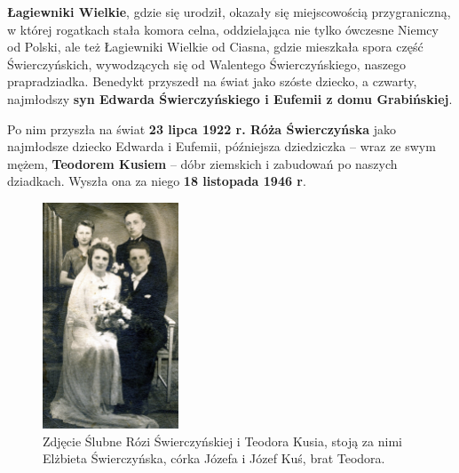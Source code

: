 \textbf{Łagiewniki Wielkie}, gdzie się urodził, okazały się miejscowością przygraniczną, w której rogatkach stała komora celna, oddzielająca nie tylko ówczesne Niemcy od Polski, ale też Łagiewniki Wielkie od Ciasna, gdzie mieszkała spora część Świerczyńskich, wywodzących się od Walentego Świerczyńskiego, naszego prapradziadka. Benedykt przyszedł na świat jako szóste dziecko, a czwarty, najmłodszy \textbf{syn Edwarda Świerczyńskiego i Eufemii z domu Grabińskiej}.

Po nim przyszła na świat \textbf{23 lipca 1922 r. Róża Świerczyńska} jako najmłodsze dziecko Edwarda i Eufemii, późniejsza dziedziczka -- wraz ze swym mężem, \textbf{Teodorem Kusiem} -- dóbr ziemskich i zabudowań po naszych dziadkach. Wyszła ona za niego \textbf{18 listopada 1946 r}.
\begin{figure}[!h]
\begin{center}
\includegraphics[width=0.36\textwidth]{photo/rozia_teodor_kus_slub.jpg}
\caption[Zdjęcie Ślubne Rózi Świerczyńskiej i Teodora Kusia]{Zdjęcie Ślubne Rózi Świerczyńskiej i Teodora Kusia, stoją za nimi Elżbieta Świerczyńska, córka Józefa i Józef Kuś, brat Teodora.}
\label{rys:rozia_teodor_kus_slub}
\end{center}
\end{figure}

